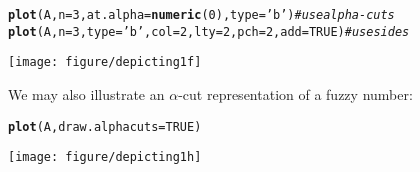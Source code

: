 \documentclass[11pt]{article}\usepackage[]{graphicx}\usepackage[]{color}
\makeatletter
\newcommand{\hlnum}[1]{\textcolor[rgb]{0.686,0.059,0.569}{#1}}%
\newcommand{\hlstr}[1]{\textcolor[rgb]{0.192,0.494,0.8}{#1}}%
\newcommand{\hlcom}[1]{\textcolor[rgb]{0.678,0.584,0.686}{\textit{#1}}}%
\newcommand{\hlstd}[1]{\textcolor[rgb]{0.345,0.345,0.345}{#1}}%
\newcommand{\hlkwc}[1]{\textcolor[rgb]{0.333,0.667,0.333}{#1}}%
\newcommand{\hlkwd}[1]{\textcolor[rgb]{0.737,0.353,0.396}{\textbf{#1}}}%
\newenvironment{kframe}{%
 \def\at@end@of@kframe{}%
 \ifinner\ifhmode%
  \def\at@end@of@kframe{\end{minipage}}%
  \begin{minipage}{\columnwidth}%
 \fi\fi%
 \def\FrameCommand##1{\hskip\@totalleftmargin \hskip-\fboxsep
 \colorbox{shadecolor}{##1}\hskip-\fboxsep
     \hskip-\linewidth \hskip-\@totalleftmargin \hskip\columnwidth}%
 \MakeFramed {\advance\hsize-\width
   \@totalleftmargin\z@ \linewidth\hsize
   \@setminipage}}%
 {\par\unskip\endMakeFramed%
 \at@end@of@kframe}
\newenvironment{knitrout}{}{} %
\makeatother
\begin{document}
\begin{knitrout}\small
{}\color{fgcolor}\begin{kframe}
\begin{alltt}
\hlkwd{plot}\hlstd{(A,} \hlkwc{n}\hlstd{=}\hlnum{3}\hlstd{,} \hlkwc{at.alpha}\hlstd{=}\hlkwd{numeric}\hlstd{(}\hlnum{0}\hlstd{),} \hlkwc{type}\hlstd{=}\hlstr{'b'}\hlstd{)} \hlcom{# use alpha-cuts}
\hlkwd{plot}\hlstd{(A,} \hlkwc{n}\hlstd{=}\hlnum{3}\hlstd{,} \hlkwc{type}\hlstd{=}\hlstr{'b'}\hlstd{,} \hlkwc{col}\hlstd{=}\hlnum{2}\hlstd{,} \hlkwc{lty}\hlstd{=}\hlnum{2}\hlstd{,} \hlkwc{pch}\hlstd{=}\hlnum{2}\hlstd{,} \hlkwc{add}\hlstd{=}\hlnum{TRUE}\hlstd{)} \hlcom{# use sides}
\end{alltt}
\end{kframe}
\end{knitrout}

\begin{center}
\begin{knitrout}\small
{}\color{fgcolor}

{\centering \texttt{[image: figure/depicting1f]} 

}



\end{knitrout}
\end{center}

\bigskip
We may also illustrate an $\alpha$-cut representation of a fuzzy number:

\begin{knitrout}\small
{}\color{fgcolor}\begin{kframe}
\begin{alltt}
\hlkwd{plot}\hlstd{(A,} \hlkwc{draw.alphacuts}\hlstd{=}\hlnum{TRUE}\hlstd{)}
\end{alltt}
\end{kframe}
\end{knitrout}

\begin{center}
\begin{knitrout}\small
{}\color{fgcolor}

{\centering \texttt{[image: figure/depicting1h]} 

}



\end{knitrout}
\end{center}
\end{document}
